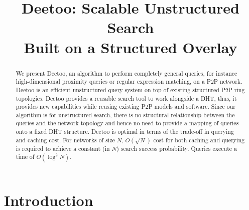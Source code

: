 \documentclass[conference]{IEEEtran}
\begin{document}
\title{Deetoo: Scalable Unstructured Search \\
	Built on a Structured Overlay}
\author{
\and
{}
}
\maketitle

\begin{abstract}

We present Deetoo, an algorithm to perform completely general queries,
for instance high-dimensional proximity queries or regular expression
matching, on a P2P network.  
Deetoo is an efficient unstructured query system on top of existing 
structured P2P ring topologies.
Deetoo provides a reusable search tool to work alongside a DHT, thus,
it provides new capabilities while reusing existing P2P models and software.
Since our algorithm is for unstructured search, there is
no structural relationship between the queries and the network topology
and hence no need to provide a mapping of queries onto a fixed DHT structure.
Deetoo is optimal in terms of the trade-off in querying and caching cost.
For networks of size $N$,
$O(\sqrt{N})$ cost for both caching and querying is required to achieve
a constant (in $N$) search success probability.  Queries execute a time
of $O(\log^2 N)$.
\end{abstract}

\section{Introduction}\label{sec:introduction} 
\end{document}
